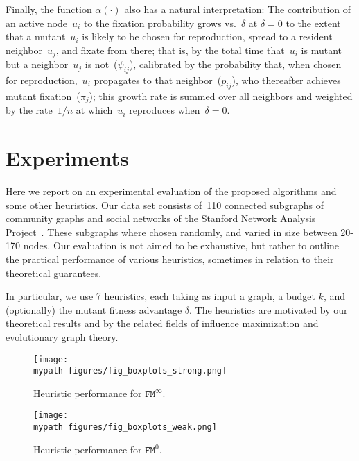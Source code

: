 \documentclass[letterpaper]{article}
\def\mypath{}
\newcommand{\NodeActivationMoranStrong}{\texttt{FM}^{\infty}}
\newcommand{\NodeActivationMoranWeak}{\texttt{FM}^{0}}
\newcommand{\FitAdv}{\delta}
\begin{document}
Finally, the function $\alpha(\cdot)$ also has a natural interpretation:
The contribution of an active node~$u_i$ to the fixation probability grows vs.~$\FitAdv$ at $\FitAdv = 0$
to the extent that a mutant~$u_i$ is likely to be chosen for reproduction,
spread to a resident neighbor~$u_j$, and fixate from there;
that is, by the total time that~$u_i$ is mutant but a neighbor~$u_j$ is not~($\psi_{ij}$),
calibrated by the probability that, when chosen for reproduction,~$u_i$ propagates to that neighbor~($p_{ij}$),
who thereafter achieves mutant fixation~($\pi_j$);
this growth rate is summed over all neighbors and weighted by the rate~$1/n$ at which~$u_i$ reproduces when~$\FitAdv=0$.


%
\section{Experiments}\label{sec:experiments}

Here we report on an experimental evaluation of the proposed algorithms and some other heuristics. 
Our data set consists of~110 connected subgraphs of community graphs and social networks of the Stanford Network Analysis Project~\cite{Leskovec2014}.
These subgraphs where chosen randomly, and varied in size between 20-170 nodes.
Our evaluation is not aimed to be exhaustive, but rather to outline the practical performance of various heuristics, sometimes in relation to their theoretical guarantees.

In particular, we use 7 heuristics, each taking as input a graph, a budget $k$, and (optionally) the mutant fitness advantage $\FitAdv$.
The heuristics are motivated by our theoretical results and by the related fields of influence maximization and evolutionary graph theory.
%
%
\begin{figure*}[!ht]
\centerline{
\texttt{[image: \\mypath figures/fig\_boxplots\_strong.png]}
}
\caption{Heuristic performance for $\NodeActivationMoranStrong$.}\label{fig:experiments_strong}
\end{figure*}

\begin{figure*}[!ht]
\texttt{[image: \\mypath figures/fig\_boxplots\_weak.png]}
\caption{Heuristic performance for $\NodeActivationMoranWeak$.}\label{fig:experiments_weak}
\end{figure*}
\end{document}
